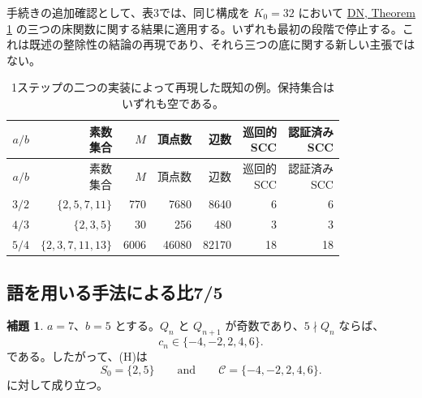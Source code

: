 \documentclass[11pt,reqno]{amsart}
\theoremstyle{definition}
\newtheorem{lemma}[theorem]{補題}
\theoremstyle{definition}
\theoremstyle{remark}
\begin{document}
手続きの追加確認として、表3では、同じ構成を \(K_0=32\) において \hyperref[ref-dn]{DN, Theorem 1} の三つの床関数に関する結果に適用する。いずれも最初の段階で停止する。これは既述の整除性の結論の再現であり、それら三つの底に関する新しい主張ではない。


\begingroup
\small
\setlength{\tabcolsep}{4pt}
\renewcommand{\arraystretch}{1.15}
\setlength{\LTcapwidth}{\textwidth}
\begin{longtable}{@{} r r r r r r r@{}}
\caption{1ステップの二つの実装によって再現した既知の例。保持集合はいずれも空である。}\label{tab:3}\\
\toprule
\(a/b\) & \shortstack[r]{素数\\集合} & \(M\) & 頂点数 & 辺数 & \shortstack[r]{巡回的\\SCC} & \shortstack[r]{認証済み\\SCC} \\
\midrule
\endfirsthead
\toprule
\(a/b\) & \shortstack[r]{素数\\集合} & \(M\) & 頂点数 & 辺数 & \shortstack[r]{巡回的\\SCC} & \shortstack[r]{認証済み\\SCC} \\
\midrule
\endhead
\bottomrule
\endlastfoot
\(3/2\) & \(\{2,\allowbreak{}5,\allowbreak{}7,\allowbreak{}11\}\) & 770 & 7680 & 8640 & 6 & 6 \\*
\(4/3\) & \(\{2,\allowbreak{}3,\allowbreak{}5\}\) & 30 & 256 & 480 & 3 & 3 \\*
\(5/4\) & \(\{2,\allowbreak{}3,\allowbreak{}7,\allowbreak{}11,\allowbreak{}13\}\) & 6006 & 46080 & 82170 & 18 & 18 \\
\end{longtable}
\endgroup

\subsection{語を用いる手法による比7/5}\label{sec:5.2}

\begin{samepage}
\begin{lemma}\leavevmode\label{thm:23}
\(a=7\)、\(b=5\) とする。\(Q_n\) と \(Q_{n+1}\) が奇数であり、\(5\nmid Q_n\) ならば、
\[
c_n\in\{-4,-2,2,4,6\}.
\]
である。したがって、(H)は
\[
S_0=\{2,5\}\qquad \text{and}\qquad \mathcal C=\{-4,-2,2,4,6\}.
\]
に対して成り立つ。
\label{thm-end:23}
\end{lemma}
\end{samepage}
\end{document}
